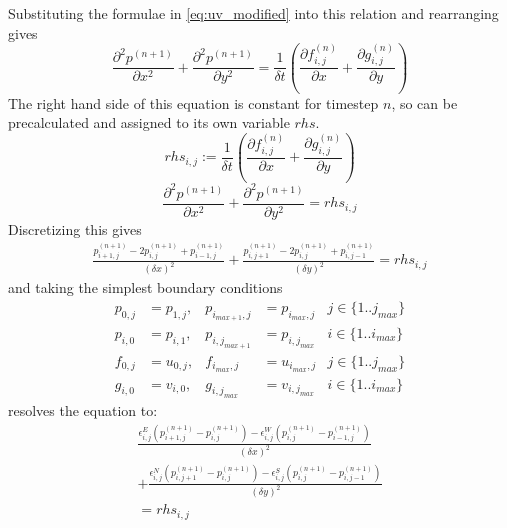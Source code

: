 Substituting the formulae in \cref{eq:uv_modified} into this relation and rearranging gives
\begin{equation}
    \frac{\partial^2{p^{(n+1)}}}{\partial{x^2}} + \frac{\partial^2{p^{(n+1)}}}{\partial{y^2}} = \frac{1}{\delta{t}}\left(\frac{\partial{f^{(n)}_{i,j}}}{\partial{x}} + \frac{\partial{g^{(n)}_{i,j}}}{\partial{y}}\right)
\end{equation}
The right hand side of this equation is constant for timestep $n$, so can be precalculated and assigned to its own variable $rhs$.
\begin{equation}
rhs_{i,j} := \frac{1}{\delta{t}}\left(\frac{\partial{f^{(n)}_{i,j}}}{\partial{x}} + \frac{\partial{g^{(n)}_{i,j}}}{\partial{y}}\right)
\end{equation}
\begin{equation}
\frac{\partial^2{p^{(n+1)}}}{\partial{x^2}} + \frac{\partial^2{p^{(n+1)}}}{\partial{y^2}} = rhs_{i,j}
\end{equation}
Discretizing this gives
\newcommand{\discretized}[4]{#1^{#2}_{#3,#4}}
\newcommand{\pdisc}[3]{\discretized{p}{(#1)}{#2}{#3}}
\newcommand{\fdisc}[3]{\discretized{f}{(#1)}{#2}{#3}}
\newcommand{\gdisc}[3]{\discretized{g}{(#1)}{#2}{#3}}
\newcommand{\ebounds}[1]{\discretized{\epsilon}{#1}{i}{j}}
\begin{multline}
    \frac{\pdisc{n+1}{i+1}{j} - 2\pdisc{n+1}{i}{j} + \pdisc{n+1}{i-1}{j}}
    {(\delta{x})^2} + 
    \frac{\pdisc{n+1}{i}{j+1} - 2\pdisc{n+1}{i}{j} + \pdisc{n+1}{i}{j-1}}
    {(\delta{y})^2}
    = rhs_{i,j}
\end{multline}
and taking the simplest boundary conditions\cite{book:griebel1998numerical}
\begin{align}
    p_{0,j} &= p_{1,j}, & p_{i_{max+1},j} &= p_{i_{max},j} & j \in \{1..j_{max}\} \\
    p_{i,0} &= p_{i,1}, & p_{i,j_{max+1}} &= p_{i,j_{max}} & i \in \{1..i_{max}\} \\
    f_{0,j} &= u_{0,j}, & f_{i_{max},j} &= u_{i_{max},j} & j \in \{1..j_{max}\} \\
    g_{i,0} &= v_{i,0}, & g_{i,j_{max}} &= v_{i,j_{max}} & i \in \{1..i_{max}\}
\end{align}
resolves the equation to:
\begin{multline}
    \frac{\ebounds{E}(\pdisc{n+1}{i+1}{j} - \pdisc{n+1}{i}{j}) - \ebounds{W}(\pdisc{n+1}{i}{j} - \pdisc{n+1}{i-1}{j})}
    {(\delta{x})^2} \\
    + \frac{\ebounds{N}(\pdisc{n+1}{i}{j+1} - \pdisc{n+1}{i}{j}) - \ebounds{S}(\pdisc{n+1}{i}{j} - \pdisc{n+1}{i}{j-1})}
    {(\delta{y})^2}\\
    = rhs_{i,j}
    \label{eq:poisson_pre_sor}
\end{multline}

